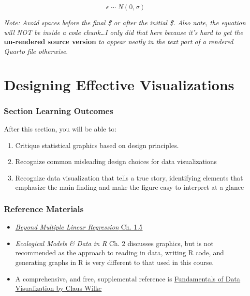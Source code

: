 \documentclass[
  letterpaper,
  DIV=11,
  numbers=noendperiod]{scrreprt}
\providecommand{\tightlist}{%
  \setlength{\itemsep}{0pt}\setlength{\parskip}{0pt}}\usepackage{longtable,booktabs,array}
\theoremstyle{remark}
\begin{document}
\[\epsilon \sim N(0, \sigma)\]

\emph{Note: Avoid spaces before the final \$ or after the initial \$.
Also note, the equation will NOT be inside a code chunk\ldots I only did
that here because it's hard to get the} \textbf{un-rendered source
version} \emph{to appear neatly in the text part of a rendered Quarto
file otherwise.}

\part{Designing Effective Visualizations}

\section*{Section Learning Outcomes}\label{section-learning-outcomes}


After this section, you will be able to:

\begin{enumerate}
\def\labelenumi{\arabic{enumi}.}
\tightlist
\item
  Critique statistical graphics based on design principles.
\item
  Recognize common misleading design choices for data visualizations
\item
  Recognize data visualization that tells a true story, identifying
  elements that emphasize the main finding and make the figure easy to
  interpret at a glance
\end{enumerate}

\section*{Reference Materials}\label{reference-materials-1}


\begin{itemize}
\tightlist
\item
  \href{https://bookdown.org/roback/bookdown-BeyondMLR/ch-MLRreview.html\#explorech1}{\emph{Beyond
  Multiple Linear Regression} Ch. 1.5}
\item
  \emph{Ecological Models \& Data in R} Ch. 2 discusses graphics, but is
  not recommended as the approach to reading in data, writing R code,
  and generating graphs in R is very different to that used in this
  course.
\item
  A comprehensive, and free, supplemental reference is
  \href{https://clauswilke.com/dataviz/}{Fundamentals of Data
  Visualization by Claus Wilke}
\end{itemize}
\end{document}
